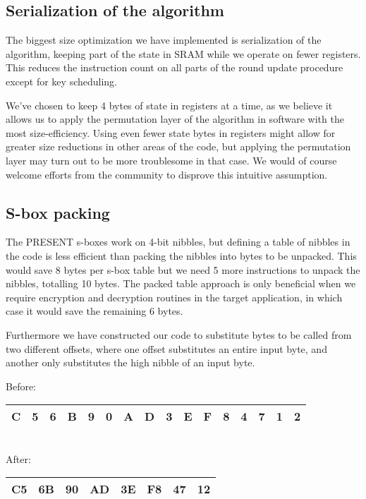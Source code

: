 \documentclass{article}
\begin{document}
\subsection{Serialization of the algorithm}
The biggest size optimization we have implemented is serialization of the algorithm, keeping part of the state in SRAM while we operate on fewer registers.
This reduces the instruction count on all parts of the round update procedure except for key scheduling.

We've chosen to keep 4 bytes of state in registers at a time, as we believe it allows us to apply the permutation layer of the algorithm in software with the most size-efficiency.
Using even fewer state bytes in registers might allow for greater size reductions in other areas of the code, but applying the permutation layer may turn out to be more troublesome in that case.
We would of course welcome efforts from the community to disprove this intuitive assumption.

\subsection{S-box packing}
The PRESENT s-boxes work on 4-bit nibbles, but defining a table of nibbles in the code is less efficient than packing the nibbles into bytes to be unpacked.
This would save 8 bytes per s-box table but we need 5 more instructions to unpack the nibbles, totalling 10 bytes.
The packed table approach is only beneficial when we require encryption and decryption routines in the target application, in which case it would save the remaining 6 bytes.

Furthermore we have constructed our code to substitute bytes to be called from two different offsets, where one offset substitutes an entire input byte, and another only substitutes the high nibble of an input byte.

	\footnotesize{
	Before: \\
	\begin{tabular}{ | c | c | c | c | c | c | c | c | c | c | c | c | c | c | c | c | }
	  \hline                        
	  C & 5 & 6 & B & 9 & 0 & A & D & 3 & E & F & 8 & 4 & 7 & 1 & 2 \\
	  \hline  
	\end{tabular}
	\\

	After: \\
	\begin{tabular}{ | c | c | c | c | c | c | c | c | }
	  \hline                        
	  C5 & 6B & 90 & AD & 3E & F8 & 47 & 12 \\
	  \hline  
	\end{tabular}
	}
\end{document}
